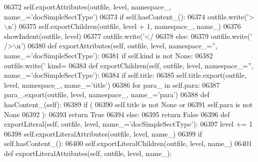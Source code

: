 \begin{DoxyCode}
{{{{{{{{{{{{{{{{{{{{{{{{{{{{{{{{{{{{{{{{{{{{{{{{{{{{{{{{{{{{{{{{{{{{{{{{{{{{{{{{{{{{{{{{{{{{{{{{{{{{{{{{{{{{{{{{{{{{{{{{{{{{{{{{{{{{{{{{{{{{{{{{{{{{{{{{{{{{{{{{{{{{{{{{{{{{{{{{{{{{{{{{{{{{{{{{{{{{{{{{{{{{{{{{{{{{{{{{{{{{{{{{{{{{{{{{{{{{{{{{{{{{{{{{{{{{{{{{{{{{{{{{{{{{{{{{{{{{{{{{{{{{{{{{{{{{{{{{{{{{{{{{{{{{{{{{{{{{{{{{{{{{{{{{{{{{{{{{{{{{{{{{{{{{{{{{{{{{{{{{{{{{{{{{{{{{{{{{{{{{{{{{{{{{{{{{{06372         self.exportAttributes(outfile, level, namespace\_, name\_=\textcolor{stringliteral}{'docSimpleSectType'})
06373         \textcolor{keywordflow}{if} self.hasContent_():
06374             outfile.write(\textcolor{stringliteral}{'>\(\backslash\)n'})
06375             self.exportChildren(outfile, level + 1, namespace\_, name\_)
06376             showIndent(outfile, level)
06377             outfile.write(\textcolor{stringliteral}{'</%
06378         \textcolor{keywordflow}{else}:
06379             outfile.write(\textcolor{stringliteral}{' />\(\backslash\)n'})
06380     \textcolor{keyword}{def }exportAttributes(self, outfile, level, namespace\_='', name\_='docSimpleSectType'):
06381         \textcolor{keywordflow}{if} self.kind \textcolor{keywordflow}{is} \textcolor{keywordflow}{not} \textcolor{keywordtype}{None}:
06382             outfile.write(\textcolor{stringliteral}{' kind=%
06383     \textcolor{keyword}{def }exportChildren(self, outfile, level, namespace\_='', name\_='docSimpleSectType'):
06384         \textcolor{keywordflow}{if} self.title:
06385             self.title.export(outfile, level, namespace\_, name\_=\textcolor{stringliteral}{'title'})
06386         \textcolor{keywordflow}{for} para\_ \textcolor{keywordflow}{in} self.para:
06387             para\_.export(outfile, level, namespace\_, name\_=\textcolor{stringliteral}{'para'})
06388     \textcolor{keyword}{def }hasContent_(self):
06389         \textcolor{keywordflow}{if} (
06390             self.title \textcolor{keywordflow}{is} \textcolor{keywordflow}{not} \textcolor{keywordtype}{None} \textcolor{keywordflow}{or}
06391             self.para \textcolor{keywordflow}{is} \textcolor{keywordflow}{not} \textcolor{keywordtype}{None}
06392             ):
06393             \textcolor{keywordflow}{return} \textcolor{keyword}{True}
06394         \textcolor{keywordflow}{else}:
06395             \textcolor{keywordflow}{return} \textcolor{keyword}{False}
06396     \textcolor{keyword}{def }exportLiteral(self, outfile, level, name\_='docSimpleSectType'):
06397         level += 1
06398         self.exportLiteralAttributes(outfile, level, name\_)
06399         \textcolor{keywordflow}{if} self.hasContent_():
06400             self.exportLiteralChildren(outfile, level, name\_)
06401     \textcolor{keyword}{def }exportLiteralAttributes(self, outfile, level, name\_):
}}}}}}}}}}}}}}}}}}}}}}}}}}}}}}}}}}}}}}}}}}}}}}}}}}}}}}}}}}}}}}}}}}}}}}}}}}}}}}}}}}}}}}}}}}}}}}}}}}}}}}}}}}}}}}}}}}}}}}}}}}}}}}}}}}}}}}}}}}}}}}}}}}}}}}}}}}}}}}}}}}}}}}}}}}}}}}}}}}}}}}}}}}}}}}}}}}}}}}}}}}}}}}}}}}}}}}}}}}}}}}}}}}}}}}}}}}}}}}}}}}}}}}}}}}}}}}}}}}}}}}}}}}}}}}}}}}}}}}}}}}}}}}}}}}}}}}}}}}}}}}}}}}}}}}}}}}}}}}}}}}}}}}}}}}}}}}}}}}}}}}}}}}}}}}}}}}}}}}}}}}}}}}}}}}}}}}}}}}}}}}}}}}}}}}}}}}}
\end{DoxyCode}
